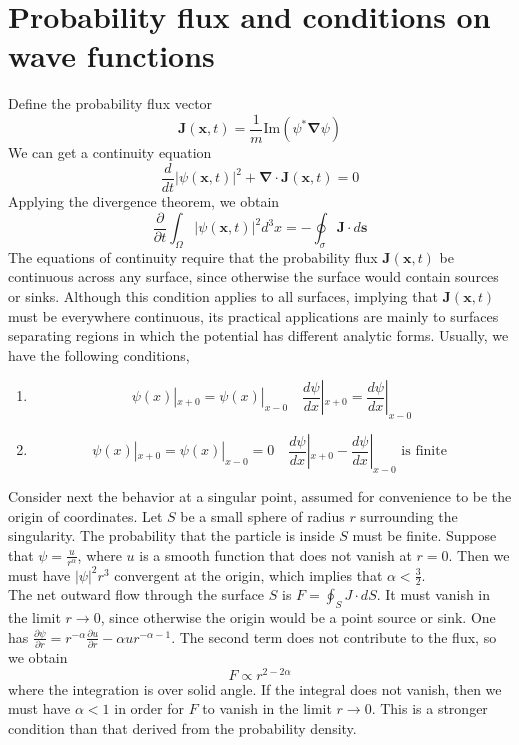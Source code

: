 \section{Probability flux and conditions on wave functions}
\noindent
Define the probability flux vector
\[\bm{J}(\bm{x},t) = \frac{1}{m} \mathrm{Im}(\psi^*\bm{\nabla}\psi)\]
We can get a continuity equation
\[\frac{d}{dt} |\psi(\bm{x},t)|^2 + \bm{\nabla} \cdot \bm{J}(\bm{x},t) = 0\]
Applying the divergence theorem, we obtain
\[\frac{\partial}{\partial t} \int_{\Omega} |\psi(\bm{x},t)|^2 d^3x = - \oint_{\sigma} \bm{J} \cdot d\bm{s}\]
The equations of continuity require that the probability
flux $\bm{J}(\bm{x},t)$ be continuous across any surface, since otherwise the surface would contain sources or sinks. Although this condition applies to all surfaces, implying that $\bm{J}(\bm{x},t)$ must be everywhere continuous, its practical applications are mainly to surfaces separating regions in which the potential has different analytic forms.
Usually, we have the following conditions,
\begin{enumerate}
\item \[\psi(x)|_{x+0} = \psi(x)|_{x-0} \quad \frac{d\psi}{dx}|_{x+0} = \frac{d\psi}{dx}|_{x-0}\]
\item \[\psi(x)|_{x+0} = \psi(x)|_{x-0} = 0 \quad \frac{d\psi}{dx}|_{x+0} - \frac{d\psi}{dx}|_{x-0} \mbox{ is finite }\]
\end{enumerate}
\noindent
Consider next the behavior at a singular point, assumed for convenience to be the origin of coordinates. Let $S$ be a small sphere of radius $r$ surrounding the singularity. The probability that the particle is inside $S$ must be finite.
Suppose that $\psi = \frac{u}{r^{\alpha}}$, where $u$ is a smooth function that does not vanish at $r=0$. Then we must have $|\psi|^2 r^3$ convergent at the origin, which implies that $\alpha < \frac{3}{2}$.\\
The net outward flow through the surface $S$ is $F = \oint_{S} J \cdot dS$. It must vanish in the limit $r \to 0$, since otherwise the origin would be a point source or sink.
One has $\frac{\partial \psi}{\partial r} = r^{-\alpha} \frac{\partial u}{\partial r} - \alpha u r^{-\alpha-1}$. The second term does not contribute to the flux, so we obtain
\[F \propto r^{2-2\alpha}\]
where the integration is over solid angle. If the integral does not vanish, then we must have $\alpha <1$ in order for $F$ to vanish in the limit $r \to 0$. This is a stronger condition than that derived from the probability density. \\
